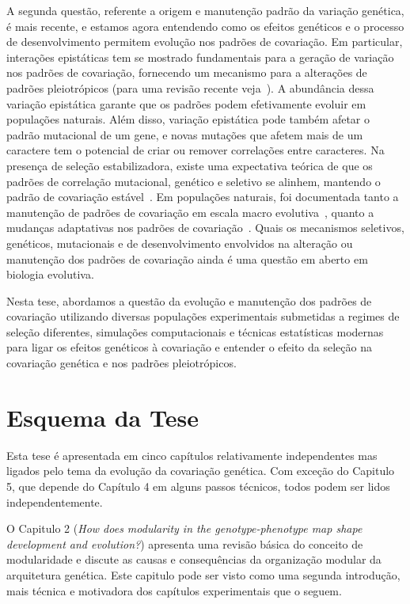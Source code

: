 \begin{refsection}
A segunda questão, referente a origem e manutenção padrão da variação
genética, é mais recente, e estamos agora entendendo como os efeitos genéticos
e o processo de desenvolvimento permitem evolução nos padrões de covariação.
Em particular, interações epistáticas tem se mostrado fundamentais para a
geração de variação nos padrões de covariação, fornecendo um mecanismo para a
alterações de padrões pleiotrópicos (para uma revisão recente
veja~\textcite{Pavlicev2015-up}). A abundância dessa variação epistática
garante que os padrões podem efetivamente evoluir em populações naturais. Além
disso, variação epistática pode também afetar o padrão mutacional de um gene,
e  novas mutações que afetem mais de um caractere tem o potencial de criar ou
remover correlações entre caracteres. Na presença de seleção estabilizadora,
existe uma expectativa teórica de que os padrões de correlação mutacional,
genético e seletivo se alinhem, mantendo o padrão de covariação
estável~\parencite{Cheverud1984-mi}. Em populações naturais, foi documentada
tanto a manutenção de padrões de covariação em escala macro
evolutiva~\parencite{Marroig2001-ne}, quanto a mudanças adaptativas nos
padrões de covariação~\parencite{Young2005-nk}. Quais os mecanismos seletivos,
genéticos, mutacionais e de desenvolvimento envolvidos na alteração ou
manutenção dos padrões de covariação ainda é uma questão em aberto em biologia
evolutiva.

Nesta tese, abordamos a questão da evolução e manutenção dos padrões de
covariação utilizando diversas populações experimentais submetidas a regimes
de seleção diferentes, simulações computacionais e técnicas estatísticas
modernas para ligar os efeitos genéticos à covariação e entender o efeito da
seleção na covariação genética e nos padrões pleiotrópicos.

\section{Esquema da Tese} 

Esta tese é apresentada em cinco capítulos relativamente independentes mas
ligados pelo tema da evolução da covariação genética. Com exceção do Capitulo
5, que depende do Capítulo 4 em alguns passos técnicos, todos podem ser lidos
independentemente. 

O Capitulo 2 (\textit{How does modularity in the genotype-phenotype map shape
development and evolution?}) apresenta uma revisão básica do conceito de
modularidade e discute as causas e consequências da organização modular da
arquitetura genética. Este capitulo pode ser visto como uma segunda
introdução, mais técnica e motivadora dos capítulos experimentais que o seguem.


\end{refsection}
